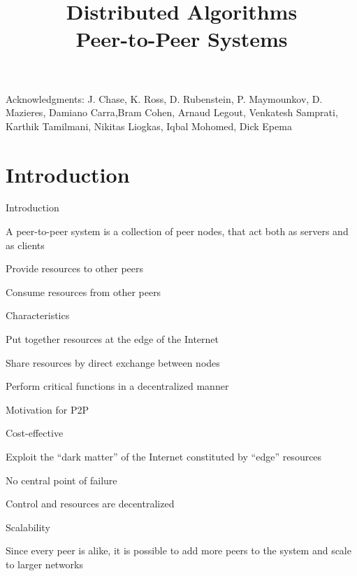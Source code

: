 
\title[DS - P2P]{\textbf{Distributed Algorithms}\\Peer-to-Peer Systems}



\newcommand{\ID}{\mathit{ID}}

\begin{frame}
\titlepage

{\tiny
Acknowledgments: J. Chase, K. Ross, D. Rubenstein, P. Maymounkov, D. Mazieres, Damiano Carra,Bram Cohen, Arnaud Legout, Venkatesh Samprati, Karthik Tamilmani, Nikitas Liogkas, Iqbal Mohomed, Dick Epema
}


\end{frame}




\section{Introduction}

\begin{frame}{Introduction}

\begin{definition}
A peer-to-peer system is a collection of \alert{peer} nodes, that act
both as servers and as clients
\BI
\item Provide resources to other peers
\item Consume resources from other peers
\EI
\end{definition}

\smallskip
\begin{block}{Characteristics}
\BI
\item Put together resources at the edge of the Internet
\item Share resources by direct exchange between nodes
\item Perform critical functions in a decentralized manner
\EI
\end{block}
\end{frame}

\begin{frame}{Motivation for P2P}

\BIL
\item \alert{Cost-effective}
	\BI
	\item Exploit the “dark matter” of the Internet constituted by “edge” resources
	\EI
\item \alert{No central point of failure}
	\BI
	\item Control and resources are decentralized
	\EI
\item \alert{Scalability}
\BI
\item Since every peer is alike, it is possible to add more peers to the system and scale to larger networks
\EI
\EIL
\end{frame}

